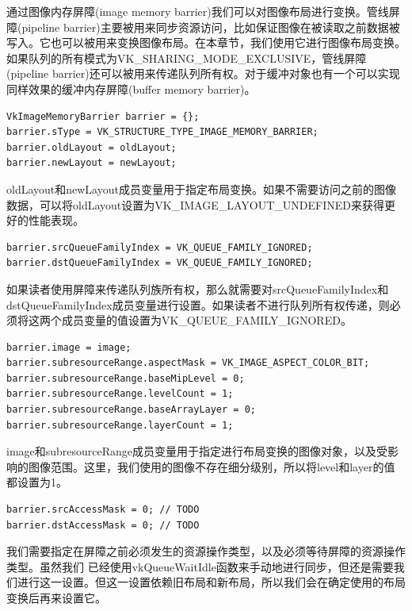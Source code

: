 \documentclass{ctexart}
\begin{document}
通过图像内存屏障(image memory barrier)我们可以对图像布局进行变换。管线屏障(pipeline barrier)主要被用来同步资源访问，比如保证图像在被读取之前数据被写入。它也可以被用来变换图像布局。在本章节，我们使用它进行图像布局变换。如果队列的所有模式为VK\_SHARING\_MODE\_EXCLUSIVE，管线屏障(pipeline barrier)还可以被用来传递队列所有权。对于缓冲对象也有一个可以实现同样效果的缓冲内存屏障(buffer memory barrier)。

\begin{lstlisting}[language={[ANSI]C}]
VkImageMemoryBarrier barrier = {};
barrier.sType = VK_STRUCTURE_TYPE_IMAGE_MEMORY_BARRIER;
barrier.oldLayout = oldLayout;
barrier.newLayout = newLayout;
\end{lstlisting}

oldLayout和newLayout成员变量用于指定布局变换。如果不需要访问之前的图像数据，可以将oldLayout设置为VK\_IMAGE\_LAYOUT\_UNDEFINED来获得更好的性能表现。

\begin{lstlisting}[language={[ANSI]C}]
barrier.srcQueueFamilyIndex = VK_QUEUE_FAMILY_IGNORED;
barrier.dstQueueFamilyIndex = VK_QUEUE_FAMILY_IGNORED;
\end{lstlisting}

如果读者使用屏障来传递队列族所有权，那么就需要对srcQueueFamilyIndex和dstQueueFamilyIndex成员变量进行设置。如果读者不进行队列所有权传递，则必须将这两个成员变量的值设置为VK\_QUEUE\_FAMILY\_IGNORED。

\begin{lstlisting}[language={[ANSI]C}]
barrier.image = image;
barrier.subresourceRange.aspectMask = VK_IMAGE_ASPECT_COLOR_BIT;
barrier.subresourceRange.baseMipLevel = 0;
barrier.subresourceRange.levelCount = 1;
barrier.subresourceRange.baseArrayLayer = 0;
barrier.subresourceRange.layerCount = 1;
\end{lstlisting}

image和subresourceRange成员变量用于指定进行布局变换的图像对象，以及受影响的图像范围。这里，我们使用的图像不存在细分级别，所以将level和layer的值都设置为1。

\begin{lstlisting}[language={[ANSI]C}]
barrier.srcAccessMask = 0; // TODO
barrier.dstAccessMask = 0; // TODO
\end{lstlisting}

我们需要指定在屏障之前必须发生的资源操作类型，以及必须等待屏障的资源操作类型。虽然我们 已经使用vkQueueWaitIdle函数来手动地进行同步，但还是需要我们进行这一设置。但这一设置依赖旧布局和新布局，所以我们会在确定使用的布局变换后再来设置它。
\end{document}
